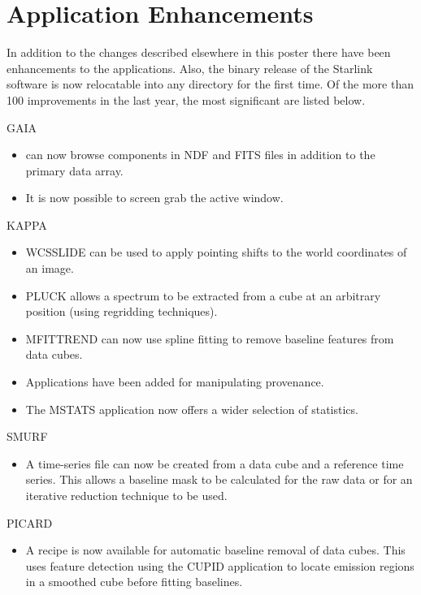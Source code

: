 \documentclass[11pt,twoside]{article}  %
\begin{document}
\section{Application Enhancements}

In addition to the changes described elsewhere in this poster there have been enhancements to the applications. Also, the binary release of the Starlink software is now relocatable into any directory for the first time. Of the more than 100 improvements in the last year, the most significant are listed below.

\begin{description}
\item GAIA
\begin{itemize}
\item can now browse components in NDF and FITS files in addition to the primary data array.
\item It is now possible to screen grab the active window.
\end{itemize}
\item KAPPA
\begin{itemize}
\item WCSSLIDE can be used to apply pointing shifts to the world coordinates of an image.
\item PLUCK allows a spectrum to be extracted from a cube at an arbitrary position (using regridding techniques).
\item MFITTREND can now use spline fitting to remove baseline features from data cubes.
\item Applications have been added for manipulating provenance.
\item The MSTATS application now offers a wider selection of statistics.
\end{itemize}

\item SMURF
\begin{itemize}
\item A time-series file can now be created from a data cube and a reference time series. This allows a baseline mask to be calculated for the raw data or for an iterative reduction technique to be used.
\end{itemize}
\item PICARD
\begin{itemize}
\item A recipe is now available for automatic baseline removal of data cubes. This uses feature detection using the CUPID application  to locate emission regions in a smoothed cube before fitting baselines.
\end{itemize}
\end{description}
\end{document}
